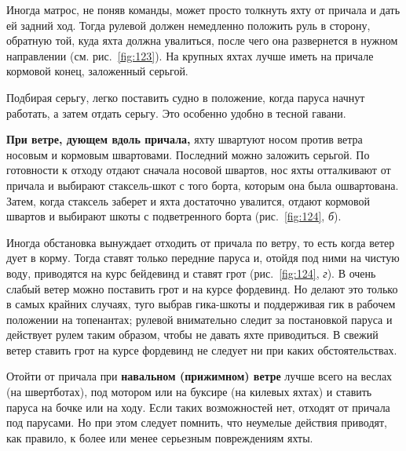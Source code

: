 \documentclass[a4paper, 12pt, twoside, final]{scrbook}
\begin{document}
Иногда матрос, не поняв команды, может просто толкнуть яхту от причала и дать ей задний ход. Тогда рулевой должен немедленно положить руль в сторону, обратную той, куда яхта должна увалиться, после чего она развернется в нужном направлении (см. рис.~\ref{fig:123}). На крупных яхтах лучше иметь на причале кормовой конец, заложенный серьгой. 

Подбирая серьгу, легко поставить судно в положение, когда паруса начнут работать, а затем отдать серьгу. Это особенно удобно в тесной гавани.

\textbf{При ветре, дующем вдоль причала,} яхту швартуют носом против ветра носовым и кормовым швартовами. Последний можно заложить серьгой. По готовности к отходу отдают сначала носовой швартов, нос яхты отталкивают от причала и выбирают стаксель-шкот с того борта, которым она была ошвартована. Затем, когда стаксель заберет и яхта достаточно увалится, отдают кормовой швартов и выбирают шкоты с подветренного борта (рис.~\ref{fig:124}, \textit{б}). 

Иногда обстановка вынуждает отходить от причала по ветру, то есть когда ветер дует в корму. Тогда ставят только передние паруса и, отойдя под ними на чистую воду, приводятся на курс бейдевинд и ставят грот (рис.~\ref{fig:124}, \textit{г}). В очень слабый ветер можно поставить грот и на курсе фордевинд. Но делают это только в самых крайних случаях, туго выбрав гика-шкоты и поддерживая гик в рабочем положении на топенантах; рулевой внимательно следит за постановкой паруса и действует рулем таким образом, чтобы не давать яхте приводиться. В свежий ветер ставить грот на курсе фордевинд не следует ни при каких обстоятельствах.

Отойти от причала при \textbf{навальном (прижимном) ветре} лучше всего на веслах (на швертботах), под мотором или на буксире (на килевых яхтах) и ставить паруса на бочке или на ходу. Если таких возможностей нет, отходят от причала под парусами. Но при этом следует помнить, что неумелые действия приводят, как правило, к более или менее серьезным повреждениям яхты.
\end{document}
